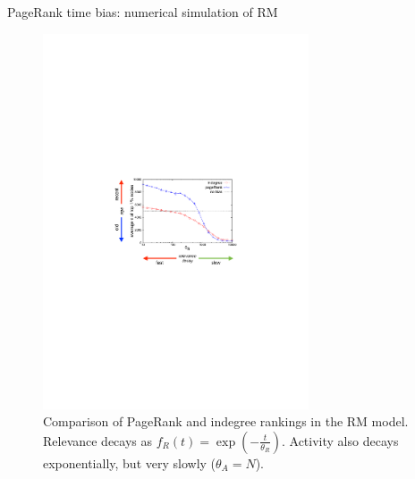 \begin{frame}{PageRank time bias: numerical simulation of RM}
    \begin{figure}
        \includegraphics[width=0.7\textwidth]{figures/PageRank_time_bias}
        \caption{Comparison of PageRank and indegree rankings in the RM model. \newline
        Relevance decays as $f_R(t) = \exp(-\frac{t}{\theta_R})$. \newline
        Activity also decays exponentially, but very slowly ($\theta_A=N$).}
    \end{figure}
\end{frame}


